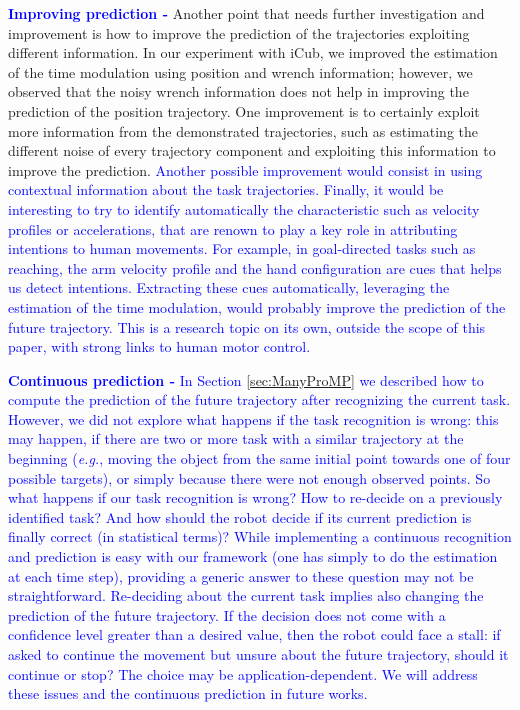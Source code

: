 \documentclass[utf8]{frontiersSCNS} %
\newcommand{\rev}[1]{\textcolor{blue}{#1}}
\begin{document}
\rev{\textbf{Improving prediction -}} Another point that needs further investigation and improvement is how to improve the prediction of the trajectories exploiting different information. In our experiment with iCub, we improved the estimation of the time modulation using position and wrench information; however, we observed that the noisy wrench information does not help in improving the prediction of the position trajectory. One improvement is to certainly exploit more information from the demonstrated trajectories, such as estimating the different noise of every trajectory component and exploiting this information to improve the prediction.
\rev{Another possible improvement would consist in using contextual information about the task trajectories.}
\rev{Finally, it would be interesting to try to identify automatically the characteristic such as velocity profiles or accelerations, that are renown to play a key role in attributing intentions to human movements. For example, in goal-directed tasks such as reaching, the arm velocity profile and the hand configuration are cues that helps us detect intentions. Extracting these cues automatically, leveraging the estimation of the time modulation, would probably improve the prediction of the future trajectory. This is a research topic on its own, outside the scope of this paper, with strong links to human motor control.}

\rev{\textbf{Continuous prediction -} In Section \ref{sec:ManyProMP} we described how to compute the prediction of the future trajectory after recognizing the current task. However, we did not explore what happens if the task recognition is wrong: this may happen, if there are two or more task with a similar trajectory at the beginning (\textit{e.g.}, moving the object from the same initial point towards one of four possible targets), or simply because there were not enough observed points. So what happens if our task recognition is wrong? How to re-decide on a previously identified task? And how should the robot decide if its current prediction is finally correct (in statistical terms)? While implementing a continuous recognition and prediction is easy with our framework (one has simply to do the estimation at each time step), providing a generic answer to these question may not be straightforward. Re-deciding about the current task implies also changing the prediction of the future trajectory. If the decision does not come with a confidence level greater than a desired value, then the robot could face a stall: if asked to continue the movement but unsure about the future trajectory, should it continue or stop? The choice may be application-dependent. We will address these issues and the continuous prediction in future works.}
\end{document}
